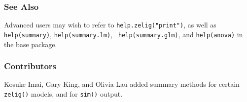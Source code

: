 \subsubsection{See Also}

Advanced users may wish to refer to {\tt help.zelig("print")},
as well as {\tt help(summary)}, {\tt help(summary.lm)}, {\tt
  help(summary.glm)}, and {\tt help(anova)} in the base package.

\subsubsection{Contributors}

Kosuke Imai, Gary King, and Olivia Lau added summary methods for
certain {\tt zelig()} models, and for {\tt sim()} output.



